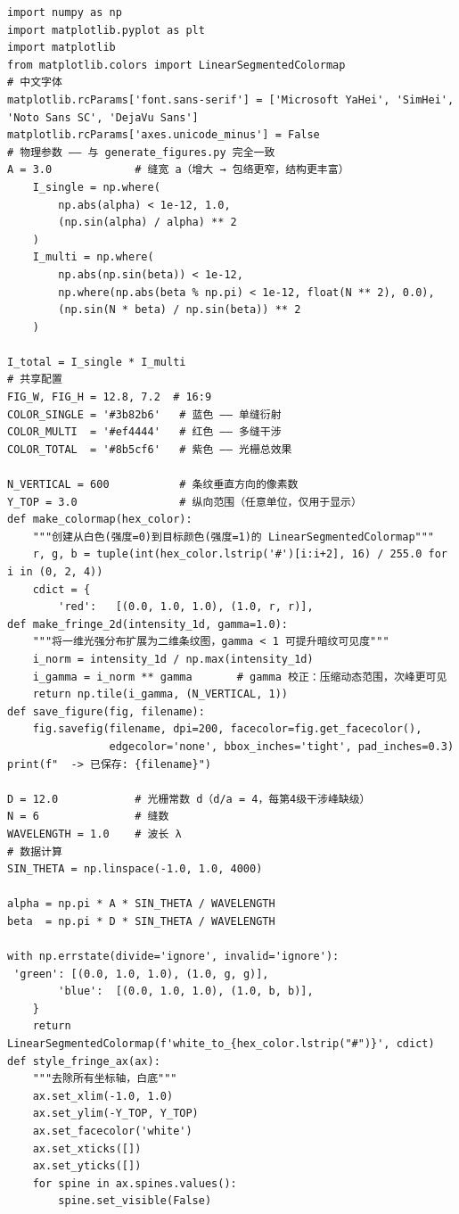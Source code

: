 \documentclass[12pt,a4paper]{ctexrep}
\begin{document}
\begin{lstlisting}[style=pycode]
import numpy as np
import matplotlib.pyplot as plt
import matplotlib
from matplotlib.colors import LinearSegmentedColormap
# 中文字体
matplotlib.rcParams['font.sans-serif'] = ['Microsoft YaHei', 'SimHei', 'Noto Sans SC', 'DejaVu Sans']
matplotlib.rcParams['axes.unicode_minus'] = False
# 物理参数 —— 与 generate_figures.py 完全一致
A = 3.0             # 缝宽 a（增大 → 包络更窄，结构更丰富）
    I_single = np.where(
        np.abs(alpha) < 1e-12, 1.0,
        (np.sin(alpha) / alpha) ** 2
    )
    I_multi = np.where(
        np.abs(np.sin(beta)) < 1e-12,
        np.where(np.abs(beta % np.pi) < 1e-12, float(N ** 2), 0.0),
        (np.sin(N * beta) / np.sin(beta)) ** 2
    )

I_total = I_single * I_multi
# 共享配置
FIG_W, FIG_H = 12.8, 7.2  # 16:9
COLOR_SINGLE = '#3b82b6'   # 蓝色 —— 单缝衍射
COLOR_MULTI  = '#ef4444'   # 红色 —— 多缝干涉
COLOR_TOTAL  = '#8b5cf6'   # 紫色 —— 光栅总效果

N_VERTICAL = 600           # 条纹垂直方向的像素数
Y_TOP = 3.0                # 纵向范围（任意单位，仅用于显示）
def make_colormap(hex_color):
    """创建从白色(强度=0)到目标颜色(强度=1)的 LinearSegmentedColormap"""
    r, g, b = tuple(int(hex_color.lstrip('#')[i:i+2], 16) / 255.0 for i in (0, 2, 4))
    cdict = {
        'red':   [(0.0, 1.0, 1.0), (1.0, r, r)],
def make_fringe_2d(intensity_1d, gamma=1.0):
    """将一维光强分布扩展为二维条纹图，gamma < 1 可提升暗纹可见度"""
    i_norm = intensity_1d / np.max(intensity_1d)
    i_gamma = i_norm ** gamma       # gamma 校正：压缩动态范围，次峰更可见
    return np.tile(i_gamma, (N_VERTICAL, 1))
def save_figure(fig, filename):
    fig.savefig(filename, dpi=200, facecolor=fig.get_facecolor(),
                edgecolor='none', bbox_inches='tight', pad_inches=0.3)    print(f"  -> 已保存: {filename}")

D = 12.0            # 光栅常数 d（d/a = 4，每第4级干涉峰缺级）
N = 6               # 缝数
WAVELENGTH = 1.0    # 波长 λ
# 数据计算
SIN_THETA = np.linspace(-1.0, 1.0, 4000)

alpha = np.pi * A * SIN_THETA / WAVELENGTH
beta  = np.pi * D * SIN_THETA / WAVELENGTH

with np.errstate(divide='ignore', invalid='ignore'):
 'green': [(0.0, 1.0, 1.0), (1.0, g, g)],
        'blue':  [(0.0, 1.0, 1.0), (1.0, b, b)],
    }
    return LinearSegmentedColormap(f'white_to_{hex_color.lstrip("#")}', cdict)
def style_fringe_ax(ax):
    """去除所有坐标轴，白底"""
    ax.set_xlim(-1.0, 1.0)
    ax.set_ylim(-Y_TOP, Y_TOP)
    ax.set_facecolor('white')
    ax.set_xticks([])
    ax.set_yticks([])
    for spine in ax.spines.values():
        spine.set_visible(False)



\end{lstlisting}
\end{document}
